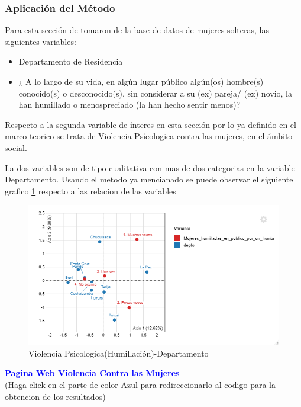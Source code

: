 \documentclass[11pt,letter]{article}
\begin{document}
\subsubsection{Aplicación del Método} 

Para esta sección de tomaron de la base de datos de mujeres solteras, las siguientes variables:
\begin{itemize}
\item Departamento de Residencia
\item ¿ A lo largo de su vida, en algún lugar público algún(os) hombre(s) conocido(s) o desconocido(s), sin considerar a su (ex) pareja/ (ex) novio, la han humillado o menospreciado (la han hecho sentir menos)?
\end{itemize}

Respecto a la segunda variable de ínteres en esta sección por lo ya definido en el marco teorico se trata de Violencia Psícologica contra las mujeres, en el ámbito social. 

La dos variables son de tipo cualitativa con mas de dos categorias en la variable Departamento. Usando el metodo ya mencianado se puede observar el siguiente grafico \ref{f1_corr} respecto a las relacion de las variables

\newpage

\begin{figure}[!htb]
    \includegraphics{analisis_corres.png}
    \caption{Violencia Psicologica(Humillación)-Departamento}
    \label{f1_corr}
\end{figure}

\href{https://ealaurel.github.io/mi_proyecto1_EST_384/proy_MineriaDatos/analisis_correspondencia.html/}{\textbf{\textcolor{blue}{Pagina Web Violencia Contra las Mujeres}}}
\\(Haga click en el parte de color Azul para redireccionarlo al codigo para la obtencion de los resultados)
\end{document}
